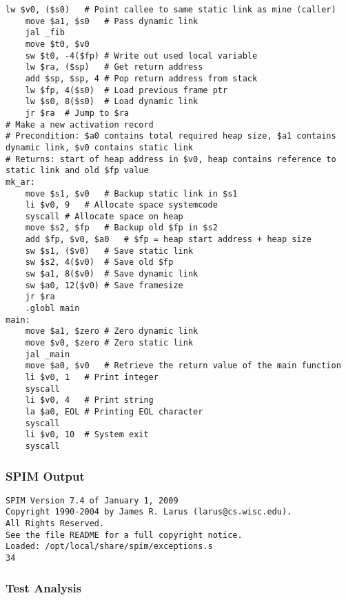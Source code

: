\begin{lstlisting}[showstringspaces=false,breaklines=true,backgroundcolor=\color{light-gray}, captionpos=b]
	lw $v0, ($s0)	# Point callee to same static link as mine (caller)
	move $a1, $s0	# Pass dynamic link
	jal _fib
	move $t0, $v0
	sw $t0, -4($fp)	# Write out used local variable
	lw $ra, ($sp)	# Get return address
	add $sp, $sp, 4	# Pop return address from stack
	lw $fp, 4($s0)	# Load previous frame ptr
	lw $s0, 8($s0)	# Load dynamic link
	jr $ra	# Jump to $ra
# Make a new activation record
# Precondition: $a0 contains total required heap size, $a1 contains dynamic link, $v0 contains static link
# Returns: start of heap address in $v0, heap contains reference to static link and old $fp value
mk_ar:
	move $s1, $v0	# Backup static link in $s1
	li $v0, 9	# Allocate space systemcode
	syscall	# Allocate space on heap
	move $s2, $fp	# Backup old $fp in $s2
	add $fp, $v0, $a0	# $fp = heap start address + heap size
	sw $s1, ($v0)	# Save static link
	sw $s2, 4($v0)	# Save old $fp
	sw $a1, 8($v0)	# Save dynamic link
	sw $a0, 12($v0)	# Save framesize
	jr $ra
	.globl main
main:
	move $a1, $zero	# Zero dynamic link
	move $v0, $zero	# Zero static link
	jal _main
	move $a0, $v0	# Retrieve the return value of the main function
	li $v0, 1	# Print integer
	syscall
	li $v0, 4	# Print string
	la $a0, EOL	# Printing EOL character
	syscall
	li $v0, 10	# System exit
	syscall

\end{lstlisting}\subsubsection{SPIM Output}
\begin{verbatim}
SPIM Version 7.4 of January 1, 2009
Copyright 1990-2004 by James R. Larus (larus@cs.wisc.edu).
All Rights Reserved.
See the file README for a full copyright notice.
Loaded: /opt/local/share/spim/exceptions.s
34
\end{verbatim}\subsubsection{Test Analysis}

